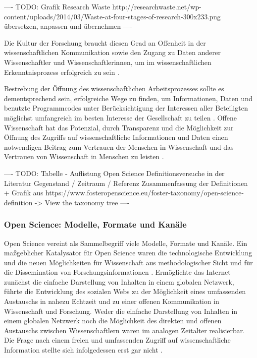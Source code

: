 ---- TODO: Grafik Research Waste http://researchwaste.net/wp-content/uploads/2014/03/Waste-at-four-stages-of-research-300x233.png übersetzen, anpassen und übernehmen ----

Die Kultur der Forschung braucht diesen Grad an Offenheit in der wissenschaftlichen Kommunikation sowie den Zugang zu Daten anderer Wissenschaftler und Wissenschaftlerinnen, um im wissenschaftlichen Erkenntnisprozess erfolgreich zu sein \cite{Fecher_2015} \cite{Krumholz_2014} \cite{Patlak_2010}.

Bestrebung der Öffnung des wissenschaftlichen Arbeitsprozesses sollte es dementsprechend sein, erfolgreiche Wege zu finden, um Informationen, Daten und benutzte Programmcodes unter Berücksichtigung der Interessen aller Beteiligten möglichst umfangreich im besten Interesse der Gesellschaft zu teilen \cite{Naeder_2010} \cite{Ross_2013} \cite{Hey_2015}. Offene Wissenschaft hat das Potenzial, durch Transparenz und die Möglichkeit zur Öffnung des Zugriffs auf wissenschaftliche Informationen und Daten einen notwendigen Beitrag zum Vertrauen der Menschen in Wissenschaft und das Vertrauen von Wissenschaft in Menschen zu leisten \cite{Grand_2012}.

---- TODO: Tabelle - Auflistung Open Science Definitionsversuche in der Literatur Gegenstand / Zeitraum / Referenz Zusammenfassung der Definitionen + Grafik aus https://www.fosteropenscience.eu/foster-taxonomy/open-science-definition -> View the taxonomy tree ----

\subsubsection{Open Science: Modelle, Formate und Kanäle}

Open Science vereint als Sammelbegriff viele Modelle, Formate und Kanäle. Ein maßgeblicher Katalysator für Open Science waren die technologische Entwicklung und die neuen Möglichkeiten für Wissenschaft aus methodologischer Sicht und für die Dissemination von Forschungsinformationen \cite{Garcia_2010}. Ermöglichte das Internet zunächst die einfache Darstellung von Inhalten in einem globalen Netzwerk, führte die Entwicklung des sozialen Webs zu der Möglichkeit eines umfassenden Austauschs in nahezu Echtzeit und zu einer offenen Kommunikation in Wissenschaft und Forschung. Weder die einfache Darstellung von Inhalten in einem globalen Netzwerk noch die Möglichkeit des direkten und offenen Austauschs zwischen Wissenschaftlern waren im analogen Zeitalter realisierbar. Die Frage nach einem freien und umfassenden Zugriff auf wissenschaftliche Information stellte sich infolgedessen erst gar nicht \cite{Schirmbacher_2007}.

